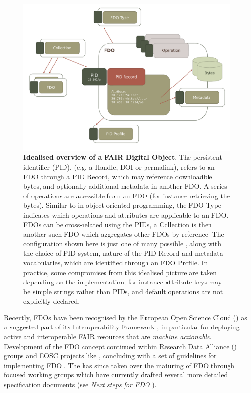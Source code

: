 \begin{figure}[hbt]
  \includegraphics[width=\textwidth]{figures/ch03/fdo.pdf}
    \caption[Idealised overview of a FAIR Digital Object]{\textbf{Idealised overview of a FAIR Digital Object}. The persistent identifier (PID), (e.g. a Handle, DOI or permalink), refers to an FDO through a PID Record, which may reference downloadble bytes, and optionally additional metadata in another FDO. A series of operations are accessible from an FDO (for instance retrieving the bytes). Similar to in object-oriented programming, the FDO Type indicates which operations and attributes are applicable to an FDO. FDOs can be cross-related using the PIDs, a Collection is then another such FDO which aggregates other FDOs by reference. The configuration shown here is just one of many possible \cite{fdo-ConfigurationTypes}, along with the choice of PID system, nature of the PID Record and metadata vocabularies, which are identified through an FDO Profile. In practice, some compromises from this idealised picture are taken depending on the implementation, for instance attribute keys may be simple strings rather than PIDs, and default operations are not explicitly declared.
    \footnotemark
    }
  \label{ch3:fig:fdo}
\end{figure}



Recently, FDOs have been recognised by the European Open Science Cloud () as a suggested part of its Interoperability Framework \cite{eosc-interop-framework}, in particular for deploying active and interoperable FAIR resources that are \emph{machine actionable}. Development of the FDO concept continued within Research Data Alliance () groups and EOSC projects like , concluding with a set of guidelines for implementing FDO \cite{bonino2019}. The  has since taken over the maturing of FDO through focused working groups which have currently drafted several more detailed specification documents (see \emph{Next steps for FDO} ).

